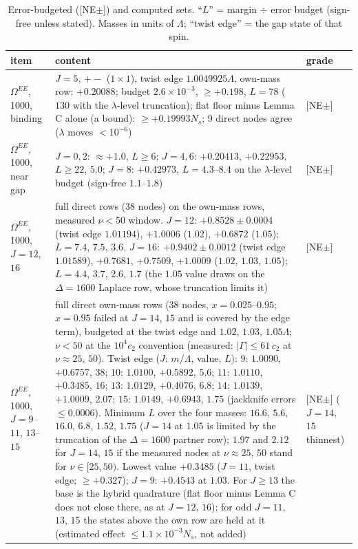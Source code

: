 \documentclass[aps,prl,onecolumn,superscriptaddress,nofootinbib]{revtex4-2}
\begin{document}
\begin{table}[!htbp]
\caption{\label{tab:computed}Error-budgeted ([NE$\pm$]) and computed sets. ``$L$'' = margin $\div$ error budget
(sign-free unless stated). Masses in units of $\Lambda$; ``twist edge'' = the gap state of that spin.}
\footnotesize
\begin{ruledtabular}
\begin{tabular}{L{3.0cm}L{10.8cm}L{2.4cm}}
item & content & grade\\\hline
$\Omega^{EE}$, 1000, binding & $J=5$, $+-$ ($1\times1$), twist edge $1.0049925\Lambda$, own-mass row: $+0.20088$; budget $2.6\times10^{-3}$, $\ge+0.198$, $L=78$ ($130$ with the $\lambda$-level truncation); flat floor minus Lemma C alone (a bound): $\ge+0.19993N_s$; 9 direct nodes agree ($\lambda$ moves $<10^{-6}$) & [NE$\pm$]\\
$\Omega^{EE}$, 1000, near gap & $J=0,2$: $\approx+1.0$, $L\ge6$; $J=4,6$: $+0.20413$, $+0.22953$, $L\ge22$, $5.0$; $J=8$: $+0.42973$, $L=4.3$--$8.4$ on the $\lambda$-level budget (sign-free $1.1$--$1.8$) & [NE$\pm$]\\
$\Omega^{EE}$, 1000, $J=12$, $16$ & full direct rows (38 nodes) on the own-mass rows, measured $\nu<50$ window. $J=12$: $+0.8528\pm0.0004$ (twist edge $1.01194$), $+1.0006$ ($1.02$), $+0.6872$ ($1.05$); $L=7.4$, $7.5$, $3.6$. $J=16$: $+0.9402\pm0.0012$ (twist edge $1.01589$), $+0.7681$, $+0.7509$, $+1.0009$ ($1.02$, $1.03$, $1.05$); $L=4.4$, $3.7$, $2.6$, $1.7$ (the $1.05$ value draws on the $\Delta=1600$ Laplace row, whose truncation limits it) & [NE$\pm$]\\
$\Omega^{EE}$, 1000, $J=9$--$11$, $13$--$15$ & full direct own-mass rows (38 nodes, $x=0.025$--$0.95$; $x=0.95$ failed at $J=14$, $15$ and is covered by the edge term), budgeted at the twist edge and $1.02$, $1.03$, $1.05\Lambda$; $\nu<50$ at the $10^4c_2$ convention (measured: $|\Gamma|\le61\,c_2$ at $\nu\approx25$, $50$). Twist edge ($J$: $m/\Lambda$, value, $L$): $9$: $1.0090$, $+0.6757$, $38$; $10$: $1.0100$, $+0.5892$, $5.6$; $11$: $1.0110$, $+0.3485$, $16$; $13$: $1.0129$, $+0.4076$, $6.8$; $14$: $1.0139$, $+1.0009$, $2.07$; $15$: $1.0149$, $+0.6943$, $1.75$ (jackknife errors $\le0.0006$). Minimum $L$ over the four masses: $16.6$, $5.6$, $16.0$, $6.8$, $1.52$, $1.75$ ($J=14$ at $1.05$ is limited by the truncation of the $\Delta=1600$ partner row); $1.97$ and $2.12$ for $J=14$, $15$ if the measured nodes at $\nu\approx25$, $50$ stand for $\nu\in[25,50)$. Lowest value $+0.3485$ ($J=11$, twist edge; $\ge+0.327$); $J=9$: $+0.4543$ at $1.03$. For $J\ge13$ the base is the hybrid quadrature (flat floor minus Lemma C does not close there, as at $J=12$, $16$); for odd $J=11$, $13$, $15$ the states above the own row are held at it (estimated effect $\le1.1\times10^{-3}N_s$, not added) & [NE$\pm$] ($J=14$, $15$ thinnest)\\

\end{tabular}
\end{ruledtabular}
\end{table}
\end{document}
